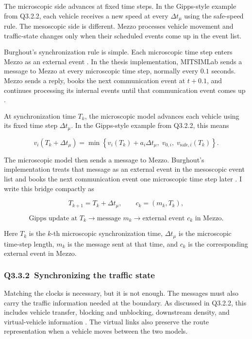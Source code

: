 \begin{bibunit}[plainnat]
The microscopic side advances at fixed time steps. In the Gipps-style example
from Q3.2.2, each vehicle receives a new speed at every $\Delta t_\mu$ using
the safe-speed rule. The mesoscopic side is different. Mezzo processes vehicle
movement and traffic-state changes only when their scheduled events come up in
the event list.

Burghout's synchronization rule is simple. Each microscopic time step enters
Mezzo as an external event \citep{burghout2005hybrid,burghout2006discrete}.
In the thesis implementation, MITSIMLab sends a message to Mezzo at every
microscopic time step, normally every $0.1$ seconds. Mezzo sends a reply,
books the next communication event at $t+0.1$, and continues processing its
internal events until that communication event comes up
\citep{burghout2004thesis}.

At synchronization time $T_k$, the microscopic model advances each vehicle
using its fixed time step $\Delta t_\mu$. In the Gipps-style example from
Q3.2.2, this means

\[
  v_i(T_k+\Delta t_\mu)
  =
  \min\left\{
    v_i(T_k)+a_i\Delta t_\mu,\;
    v_{0,i},\;
    v_{\mathrm{safe},i}(T_k)
  \right\}.
\]

The microscopic model then sends a message to Mezzo. Burghout's implementation
treats that message as an external event in the mesoscopic event list and books
the next communication event one microscopic time step later
\citep{burghout2004thesis,burghout2005hybrid,burghout2006discrete}. I write this
bridge compactly as

\[
  T_{k+1}=T_k+\Delta t_\mu,
  \qquad
  c_k=(m_k,T_k),
\]

\[
  \text{Gipps update at }T_k
  \longrightarrow
  \text{message }m_k
  \longrightarrow
  \text{external event }c_k\text{ in Mezzo}.
\]

Here $T_k$ is the $k$-th microscopic synchronization time,
$\Delta t_\mu$ is the microscopic time-step length, $m_k$ is the message sent
at that time, and $c_k$ is the corresponding external event in Mezzo.

\subsubsection{Q3.3.2\ Synchronizing the traffic state}

Matching the clocks is necessary, but it is not enough. The messages must also
carry the traffic information needed at the boundary. As discussed in Q3.2.2,
this includes vehicle transfer, blocking and unblocking, downstream density,
and virtual-vehicle information \citep{burghout2005hybrid}. The virtual links
also preserve the route representation when a vehicle moves between the two
models.


\end{bibunit}
